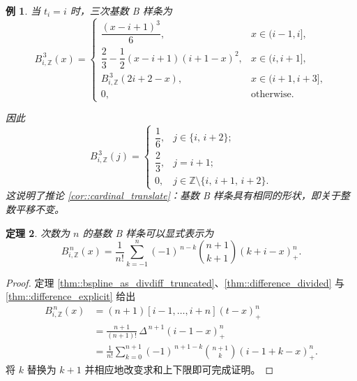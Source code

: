 \documentclass[a4paper]{ctexart}
\newtheorem{theorem}{定理}
\newtheorem{example}[theorem]{例}
\numberwithin{theorem}{section}
\numberwithin{equation}{section}
\numberwithin{figure}{section}
\numberwithin{remark}{section}
\begin{document}
\begin{example}
    \label{ex::cardinal_cubic}
当 $t_i=i$ 时，三次基数 B 样条为
\begin{equation}
\label{eq::cardinal_cubic_formula}
B^{\,3}_{i,\mathbb{Z}}(x)=
\begin{cases}
\dfrac{(x-i+1)^3}{6}, & x\in(i-1,i],\\[6pt]
\dfrac{2}{3}-\dfrac{1}{2}(x-i+1)(i+1-x)^2, & x\in(i,i+1],\\[8pt]
B^{\,3}_{i,\mathbb{Z}}(2i+2-x), & x\in(i+1,i+3],\\[6pt]
0, & \text{otherwise}.
\end{cases}
\end{equation}

因此
\begin{equation}
\label{eq::cardinal_cubic_values}
B^{\,3}_{i,\mathbb{Z}}(j)=
\begin{cases}
\dfrac{1}{6}, & j\in\{i,\,i+2\};\\[6pt]
\dfrac{2}{3}, & j=i+1;\\[6pt]
0, & j\in\mathbb{Z}\setminus\{i,\,i+1,\,i+2\}.
\end{cases}
\end{equation}
这说明了推论 \ref{cor::cardinal_translate}：基数 B 样条具有相同的形状，即关于整数平移不变。
\end{example}

\begin{theorem}
    \label{thm::cardinal_explicit}
次数为 $n$ 的基数 B 样条可以显式表示为
\begin{equation}
\label{eq::cardinal_explicit}    
B^{\,n}_{i,\mathbb{Z}}(x)
=\frac{1}{n!}\sum_{k=-1}^{n}(-1)^{\,n-k}\binom{n+1}{k+1}(k+i-x)^{n}_{+}.
\end{equation}
\end{theorem}

\begin{proof}
定理 \ref{thm::bspline_as_divdiff_truncated}、\ref{thm::difference_divided} 
与 \ref{thm::difference_explicit} 给出
\[
\begin{aligned}
B^{\,n}_{i,\mathbb{Z}}(x)
&=(n+1)[i-1,\ldots,i+n](t-x)^{n}_{+} \\
&=\frac{n+1}{(n+1)!}\,\Delta^{\,n+1}(i-1-x)^{n}_{+} \\
&=\frac{1}{n!}\sum_{k=0}^{n+1}(-1)^{\,n+1-k}\binom{n+1}{k}(i-1+k-x)^{n}_{+}.
\end{aligned}
\]
将 $k$ 替换为 $k+1$ 并相应地改变求和上下限即可完成证明。 
\end{proof}
\end{document}
